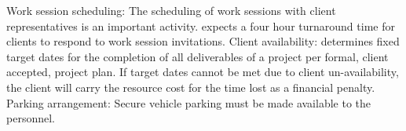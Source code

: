 \elist
\spit Work session scheduling:  The scheduling of work sessions with client representatives is an important activity.  \vendor expects a four hour turnaround time for clients to respond to work session invitations.   
\spit Client availability: \vendor determines fixed target dates for the completion of all deliverables of a project per formal, client accepted, project plan.  If target dates cannot be met due to client un-availability, the client will carry the \vendor resource cost for the time lost as a financial penalty.       
\spit Parking arrangement: Secure vehicle parking must be made available to the \vendors personnel.
\elist
